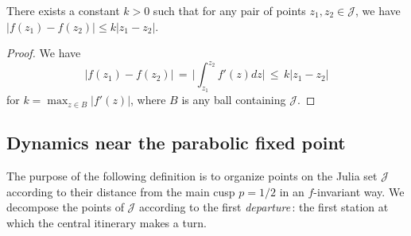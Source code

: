 \begin{lemma}
\label{expansion factor}
There exists a constant $k>0$ such that for any pair of points $z_1, z_2 \in \mathcal J$, we have 
$|f(z_1)-f(z_2)| \leq k|z_1-z_2|$.
\end{lemma}

\begin{proof}
	We have 
	\begin{equation}
		|f(z_1)-f(z_2)| \, = \,  \biggl | \int_{z_1} ^{z_2} f'(z) dz \biggr | 
  \, \leq \, k|z_1-z_2|	
	\end{equation}
for $k=\max_{z \in B} |f'(z)|$, where $B$ is any ball containing $\mathcal J$. 
\end{proof}
 
\subsection{Dynamics near the parabolic fixed point}

The purpose of the following definition is to organize points on the Julia set $\mathcal J$ according to their distance from the main cusp $p=1/2$ in an $f$-invariant way. We decompose the points of $\mathcal J$ according to the first \emph{departure}\,: the first station at which the central itinerary makes a turn.

